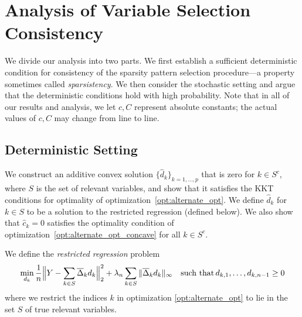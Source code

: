 \section{Analysis of Variable Selection Consistency}
\label{sec:finitesample}

We divide our analysis into two parts. We first establish a sufficient
deterministic condition for consistency of the sparsity pattern
selection procedure---a property sometimes called \textit{sparsistency}.
We then consider the
stochastic setting and argue that the deterministic conditions hold
with high probability. Note that in all of our results and analysis, we let $c,
C$ represent absolute constants; the actual values of $c,C$ may change from line to line.

\subsection{Deterministic Setting}

We construct an additive convex solution $\{\hat{d}_k\}_{k=1,\ldots,p}$
that is zero for $k \in S^c$, where $S$ is the set of relevant
variables, and show that it satisfies the KKT
conditions for optimality of optimization~\eqref{opt:alternate_opt}. We
define $\hat{d}_k$ for $k \in S$ to be a solution to the restricted
regression (defined below). We also show that $\hat{c}_k =
0$ satisfies the optimality condition of
optimization~\eqref{opt:alternate_opt_concave} for all $k \in S^c$.

\begin{definition}
\label{def:restricted_regression}
We define the \emph{restricted regression} problem 
\[
\min_{d_k} \frac{1}{n} \Big\| Y - \sum_{k \in S} \overline{\Delta}_k d_k \Big\|_2^2 + 
   \lambda_n \sum_{k \in S} \| \overline{\Delta}_k d_k \|_\infty \quad \textrm{such that} \, d_{k,1}, \ldots, d_{k,n-1} \geq 0
\]
where we restrict the indices $k$ in
optimization \eqref{opt:alternate_opt} to lie in the set $S$ of true
relevant variables.
\end{definition}

